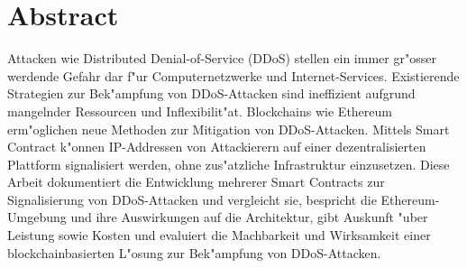 
\chapter*{Abstract}


Attacken wie Distributed Denial-of-Service (DDoS) stellen ein immer gr{"o}sser werdende Gefahr dar f{"u}r Computernetzwerke und Internet-Services.
Existierende Strategien zur Bek{"a}mpfung von DDoS-Attacken sind ineffizient aufgrund mangelnder Ressourcen und Inflexibilit{"a}t.
Blockchains wie Ethereum erm{"o}glichen neue Methoden zur Mitigation von DDoS-Attacken. Mittels Smart Contract k{"o}nnen IP-Addressen von Attackierern auf einer dezentralisierten Plattform signalisiert werden, ohne zus{"a}tzliche Infrastruktur einzusetzen.
Diese Arbeit dokumentiert die Entwicklung mehrerer Smart Contracts zur Signalisierung von DDoS-Attacken und vergleicht sie, bespricht die Ethereum-Umgebung und ihre Auswirkungen auf die Architektur, gibt Auskunft {"u}ber Leistung sowie Kosten und evaluiert die Machbarkeit und Wirksamkeit einer blockchainbasierten L{"o}sung zur Bek{"a}mpfung von DDoS-Attacken.

